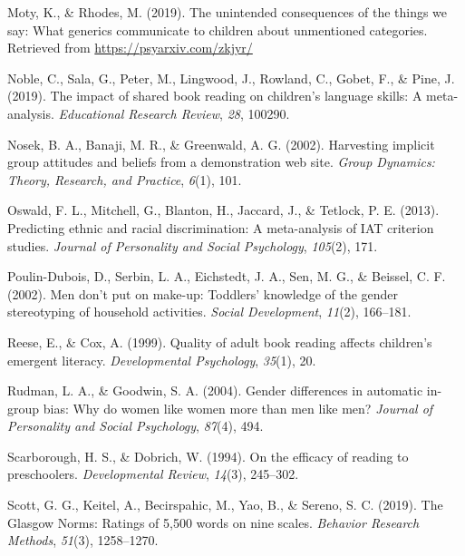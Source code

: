 \documentclass[
  english,
  ,man,floatsintext]{apa6}
\begin{document}
\leavevmode\hypertarget{ref-moty2019unintended}{}%
Moty, K., \& Rhodes, M. (2019). The unintended consequences of the things we say: What generics communicate to children about unmentioned categories. Retrieved from \url{https://psyarxiv.com/zkjyr/}

\leavevmode\hypertarget{ref-noble2019impact}{}%
Noble, C., Sala, G., Peter, M., Lingwood, J., Rowland, C., Gobet, F., \& Pine, J. (2019). The impact of shared book reading on children's language skills: A meta-analysis. \emph{Educational Research Review}, \emph{28}, 100290.

\leavevmode\hypertarget{ref-nosek2002harvesting}{}%
Nosek, B. A., Banaji, M. R., \& Greenwald, A. G. (2002). Harvesting implicit group attitudes and beliefs from a demonstration web site. \emph{Group Dynamics: Theory, Research, and Practice}, \emph{6}(1), 101.

\leavevmode\hypertarget{ref-oswald2013predicting}{}%
Oswald, F. L., Mitchell, G., Blanton, H., Jaccard, J., \& Tetlock, P. E. (2013). Predicting ethnic and racial discrimination: A meta-analysis of IAT criterion studies. \emph{Journal of Personality and Social Psychology}, \emph{105}(2), 171.

\leavevmode\hypertarget{ref-poulin2002men}{}%
Poulin-Dubois, D., Serbin, L. A., Eichstedt, J. A., Sen, M. G., \& Beissel, C. F. (2002). Men don't put on make-up: Toddlers' knowledge of the gender stereotyping of household activities. \emph{Social Development}, \emph{11}(2), 166--181.

\leavevmode\hypertarget{ref-reese1999quality}{}%
Reese, E., \& Cox, A. (1999). Quality of adult book reading affects children's emergent literacy. \emph{Developmental Psychology}, \emph{35}(1), 20.

\leavevmode\hypertarget{ref-rudman2004gender}{}%
Rudman, L. A., \& Goodwin, S. A. (2004). Gender differences in automatic in-group bias: Why do women like women more than men like men? \emph{Journal of Personality and Social Psychology}, \emph{87}(4), 494.

\leavevmode\hypertarget{ref-scarborough1994efficacy}{}%
Scarborough, H. S., \& Dobrich, W. (1994). On the efficacy of reading to preschoolers. \emph{Developmental Review}, \emph{14}(3), 245--302.

\leavevmode\hypertarget{ref-scott2019glasgow}{}%
Scott, G. G., Keitel, A., Becirspahic, M., Yao, B., \& Sereno, S. C. (2019). The Glasgow Norms: Ratings of 5,500 words on nine scales. \emph{Behavior Research Methods}, \emph{51}(3), 1258--1270.
\end{document}

